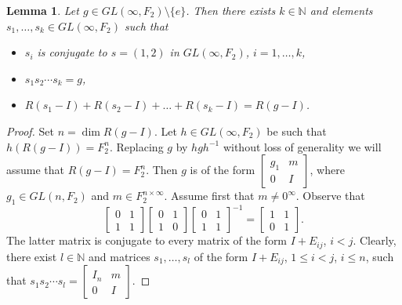\documentclass[11pt]{amsart}
\theoremstyle{plain}
\newtheorem{lemma}[theorem]{Lemma}
\theoremstyle{definition}
\theoremstyle{remark}
\numberwithin{equation}{section}
\begin{document}
	\begin{lemma}\label{lemma: factorization in GL}
	Let $g\in GL(\infty,F_2)\setminus\{e\}$. Then there exists $k\in\mathbb N$ and elements $s_1,\ldots,s_k\in GL(\infty,F_2)$ such that 
	\begin{itemize}
		\item $s_i$ is conjugate to $s=(1,2)$ in $GL(\infty,F_2)$, $i=1,\ldots,k$,
		\item $s_1s_2\cdots s_k=g$,
		\item $R(s_1-I)+R(s_2-I)+\ldots+R(s_k-I)=R(g-I)$.
	\end{itemize}
\end{lemma}
\begin{proof}
Set $n=\dim R(g-I)$. Let $h\in GL(\infty,F_2)$ be such that $h(R(g-I))=F_2^n$. Replacing $g$ by $hgh^{-1}$ without loss of generality we will assume that $R(g-I)=F_2^n$. Then $g$ is of the form 
$\begin{bmatrix}
			g_1 & m \\0 &I
\end{bmatrix}$, where $g_1 \in GL(n,F_2)$ and $m \in F_2^{n\times\infty}$. Assume first that $m \neq 0^\infty$. Observe that $$\begin{bmatrix}
			0&1\\1&1
		\end{bmatrix}
		\begin{bmatrix}
			0&1\\1&0
		\end{bmatrix}
		\begin{bmatrix}
			0&1\\1&1
		\end{bmatrix}^{-1}=
		\begin{bmatrix}
			1&1\\0&1
		\end{bmatrix}.$$
The latter matrix is conjugate to every matrix of the form $I+E_{ij}$, $i<j$. Clearly, there exist $l\in \mathbb{N}$ and matrices $s_1,\ldots,s_l$ of the form $I+E_{ij}$, $1\leqslant i<j$, $i \leqslant n$, such that $s_1s_2\cdots s_l=
		\begin{bmatrix}
			I_n&m\\0&I
		\end{bmatrix}$. 
		

\end{proof}
\end{document}
